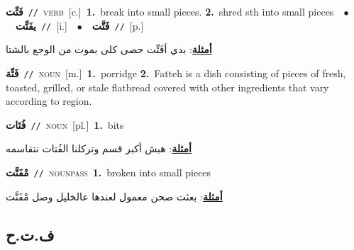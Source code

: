 \documentclass[10pt,a4paper,twoside]{article} %
\begin{document}
\begin{multicols}{2}
{{\setlength\topsep{0pt}\textbf{\foreignlanguage{arabic}{فَتِّت}}\ {\color{gray}\texttt{//}\color{black}}\ \textsc{verb}\ [c.]\ \textbf{1.}~break into small pieces.  \textbf{2.}~shred sth into small pieces\ \ $\bullet$\ \ \setlength\topsep{0pt}\textbf{\foreignlanguage{arabic}{يفَتِّت}}\ {\color{gray}\texttt{//}\color{black}}\ [i.]\ \ $\bullet$\ \ \setlength\topsep{0pt}\textbf{\foreignlanguage{arabic}{فَتَّت}}\ {\color{gray}\texttt{//}\color{black}}\ [p.]\  \begin{flushright}\color{gray}\foreignlanguage{arabic}{\textbf{\underline{\foreignlanguage{arabic}{أمثلة}}}: بدي أفَتِّت حصى كلى بموت من الوجع بالشتا}\end{flushright}\color{black}} \vspace{2mm}

{\setlength\topsep{0pt}\textbf{\foreignlanguage{arabic}{فَتِّة}}\ {\color{gray}\texttt{//}\color{black}}\ \textsc{noun}\ [m.]\ \textbf{1.}~porridge  \textbf{2.}~Fatteh is a dish consisting of pieces of fresh, toasted, grilled, or stale flatbread covered with other ingredients that vary according to region.\ 

{\setlength\topsep{0pt}\textbf{\foreignlanguage{arabic}{فُتَات}}\ {\color{gray}\texttt{//}\color{black}}\ \textsc{noun}\ [pl.]\ \textbf{1.}~bits\  \begin{flushright}\color{gray}\foreignlanguage{arabic}{\textbf{\underline{\foreignlanguage{arabic}{أمثلة}}}: هبش أكبر قسم وتركلنا الفُتات نتقاسمه}\end{flushright}\color{black}} \vspace{2mm}

{\setlength\topsep{0pt}\textbf{\foreignlanguage{arabic}{مْفَتَّت}}\ {\color{gray}\texttt{//}\color{black}}\ \textsc{noun\textunderscore pass}\ \textbf{1.}~broken into small pieces\  \begin{flushright}\color{gray}\foreignlanguage{arabic}{\textbf{\underline{\foreignlanguage{arabic}{أمثلة}}}: بعثت صحن معمول لعندها عالخليل وصل مْفَتَّت}\end{flushright}\color{black}} \vspace{2mm}

\vspace{-3mm}
\subsection*{\color{blue}\foreignlanguage{arabic}{ف.ت.ح}\color{blue}{}} 

}}
\end{multicols}
\end{document}
